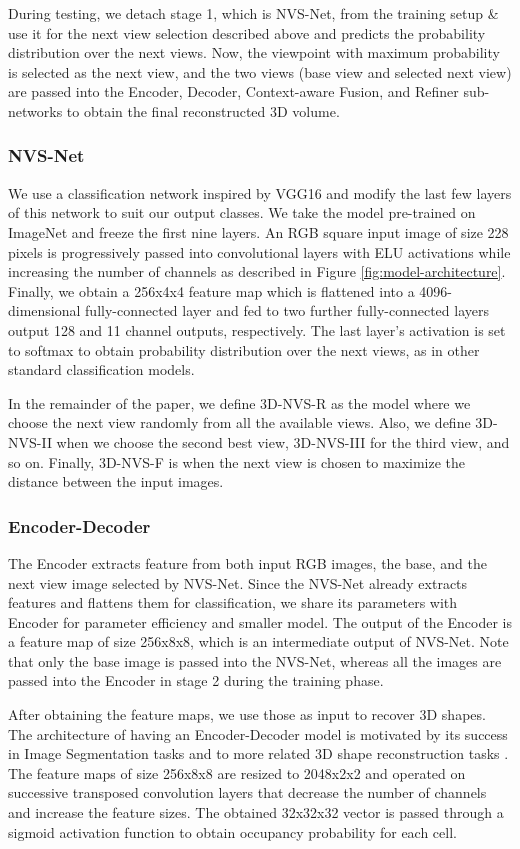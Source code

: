 During testing, we detach stage 1, which is NVS-Net, from the training setup \& use it for the next view selection described above and predicts the probability distribution over the next views. Now, the viewpoint with maximum probability is selected as the next view, and the two views (base view and selected next view) are passed into the Encoder, Decoder, Context-aware Fusion, and Refiner sub-networks to obtain the final reconstructed 3D volume.
\subsubsection{NVS-Net}
We use a classification network inspired by VGG16 \cite{vgg} and modify the last few layers of this network to suit our output classes. We take the model pre-trained on ImageNet \cite{imagenet} and freeze the first nine layers. An RGB square input image of size 228 pixels is progressively passed into convolutional layers with ELU activations while increasing the number of channels as described in Figure \ref{fig:model-architecture}. Finally, we obtain a 256x4x4 feature map which is flattened into a 4096-dimensional fully-connected layer and fed to two further fully-connected layers output 128 and 11 channel outputs, respectively. The last layer's activation is set to softmax to obtain probability distribution over the next views, as in other standard classification models.

In the remainder of the paper, we define 3D-NVS-R as the model where we choose the next view randomly from all the available views. Also, we define 3D-NVS-II when we choose the second best view, 3D-NVS-III for the third view, and so on. Finally, 3D-NVS-F is when the next view is chosen to maximize the distance between the input images.
\subsubsection{Encoder-Decoder}
The Encoder extracts feature from both input RGB images, the base, and the next view image selected by NVS-Net. Since the NVS-Net already extracts features and flattens them for classification, we share its parameters with Encoder for parameter efficiency and smaller model. The output of the Encoder is a feature map of size 256x8x8, which is an intermediate output of NVS-Net. Note that only the base image is passed into the NVS-Net, whereas all the images are passed into the Encoder in stage 2 during the training phase.

After obtaining the feature maps, we use those as input to recover 3D shapes. The architecture of having an Encoder-Decoder model is motivated by its success in Image Segmentation tasks \cite{7803544} and to more related 3D shape reconstruction tasks \cite{pix2vox}. The feature maps of size 256x8x8 are resized to 2048x2x2 and operated on successive transposed convolution layers that decrease the number of channels and increase the feature sizes. The obtained 32x32x32 vector is passed through a sigmoid activation function to obtain occupancy probability for each cell.
